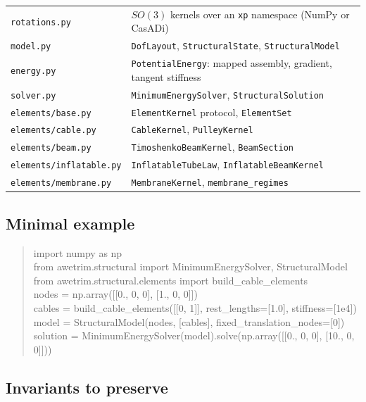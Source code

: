 \documentclass[11pt,a4paper]{article}
\newcommand{\code}[1]{\texttt{\small #1}}
\begin{document}
\begin{table}[H]
\centering
\small
\begin{tabular}{ll}
\toprule
\code{rotations.py} & $SO(3)$ kernels over an \code{xp} namespace (NumPy or CasADi)\\
\code{model.py} & \code{DofLayout}, \code{StructuralState}, \code{StructuralModel}\\
\code{energy.py} & \code{PotentialEnergy}: mapped assembly, gradient, tangent stiffness\\
\code{solver.py} & \code{MinimumEnergySolver}, \code{StructuralSolution}\\
\code{elements/base.py} & \code{ElementKernel} protocol, \code{ElementSet}\\
\code{elements/cable.py} & \code{CableKernel}, \code{PulleyKernel}\\
\code{elements/beam.py} & \code{TimoshenkoBeamKernel}, \code{BeamSection}\\
\code{elements/inflatable.py} & \code{InflatableTubeLaw}, \code{InflatableBeamKernel}\\
\code{elements/membrane.py} & \code{MembraneKernel}, \code{membrane\_regimes}\\
\bottomrule
\end{tabular}
\end{table}

\subsection{Minimal example}

\begin{quote}\small\ttfamily
\noindent
import numpy as np\\
from awetrim.structural import MinimumEnergySolver, StructuralModel\\
from awetrim.structural.elements import build\_cable\_elements\\[4pt]
nodes = np.array([[0., 0, 0], [1., 0, 0]])\\
cables = build\_cable\_elements([[0, 1]], rest\_lengths=[1.0], stiffness=[1e4])\\
model = StructuralModel(nodes, [cables], fixed\_translation\_nodes=[0])\\
solution = MinimumEnergySolver(model).solve(np.array([[0., 0, 0], [10., 0, 0]]))
\end{quote}

\subsection{Invariants to preserve}
\end{document}
